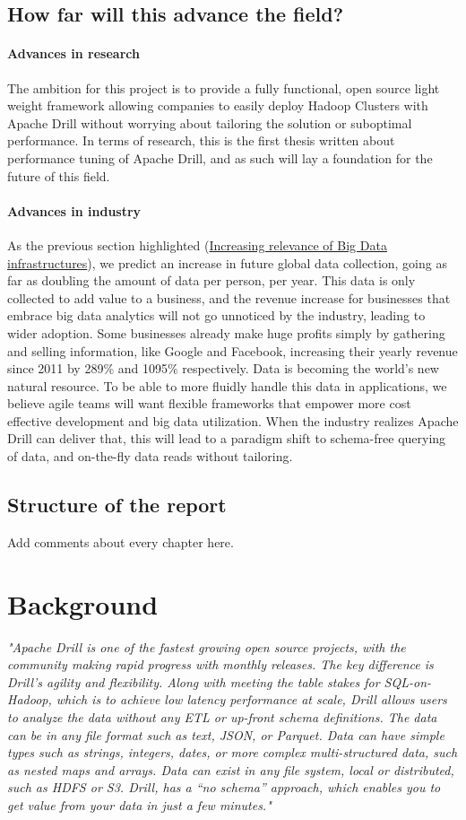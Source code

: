 \documentclass[a4paper,english]{report}
\begin{document}
		\section{How far will this advance the field?}
			\subsubsection{Advances in research}
			The ambition for this project is to provide a fully functional, open source light weight framework allowing companies to easily deploy Hadoop Clusters with Apache Drill without worrying about tailoring the solution or suboptimal performance. In terms of research, this is the first thesis written about performance tuning of Apache Drill, and as such will lay a foundation for the future of this field.
			\subsubsection{Advances in industry}
			As the previous section highlighted (\hyperref[big_data]{Increasing relevance of Big Data infrastructures}), we predict an increase in future global data collection, going as far as doubling the amount of data per person, per year. This data is only collected to add value to a business, and the revenue increase for businesses that embrace big data analytics will not go unnoticed by the industry, leading to wider adoption. Some businesses already make huge profits simply by gathering and selling information, like Google and Facebook, increasing their yearly revenue since 2011 by 289\% and 1095\% respectively\cite{statista}. Data is becoming the world’s new natural resource\cite{future_data}. To be able to more fluidly handle this data in applications, we believe agile teams will want flexible frameworks that empower more cost effective development and big data utilization. When the industry realizes Apache Drill can deliver that, this will lead to a paradigm shift to schema-free querying of data, and on-the-fly data reads without tailoring.
		
		\section{Structure of the report}
		Add comments about every chapter here.
		
	\chapter{Background}
	\emph{"Apache Drill is one of the fastest growing open source projects, with the community making rapid progress with monthly releases. The key difference is Drill’s agility and flexibility. Along with meeting the table stakes for SQL-on-Hadoop, which is to achieve low latency performance at scale, Drill allows users to analyze the data without any ETL or up-front schema definitions. The data can be in any file format such as text, JSON, or Parquet. Data can have simple types such as strings, integers, dates, or more complex multi-structured data, such as nested maps and arrays. Data can exist in any file system, local or distributed, such as HDFS or S3. Drill, has a “no schema” approach, which enables you to get value from your data in just a few minutes."}\cite{drill}
\end{document}
